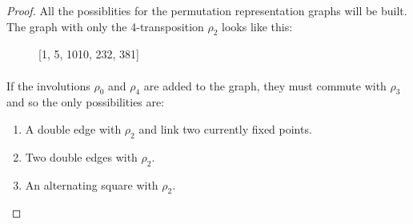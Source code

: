 \begin{proof}
  All the possiblities for the permutation representation graphs will be built. The graph with only the 4-transposition $\rho_2$ looks like this:

  \begin{figure}[H]
    \begin{center}
      \caption{[1, 5, 1010, 232, 381]}
    \end{center}
  \end{figure}

\paragraph{}
If the involutions $\rho_0$ and $\rho_4$ are added to the graph, they must commute with $\rho_3$ and so the only possibilities are:
\begin{enumerate}
  \item A double edge with $\rho_2$ and link two currently fixed points.
  \item Two double edges with $\rho_2$.
  \item An alternating square with $\rho_2$.
\end{enumerate}


\end{proof}
